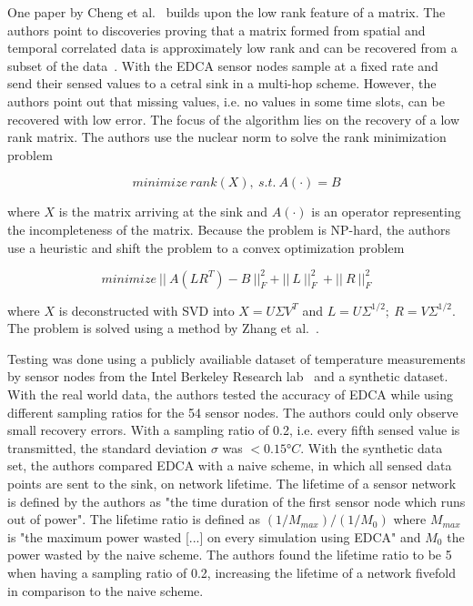 One paper by Cheng et al.~\cite{cheng2010efficient} builds upon the low rank
feature of a matrix. The authors point to discoveries proving that a matrix
formed from spatial and temporal correlated data is approximately low rank and
can be recovered from a subset of the data~\cite{vuran2004spatio,
candes2009exact}. With the \ac{EDCA} sensor nodes sample at a fixed rate and
send their sensed values to a cetral sink in a multi-hop scheme. However, the
authors point out that missing values, i.e. no values in some time slots, can
be recovered with low error. The focus of the algorithm lies on the recovery of
a low rank
matrix. The authors use the nuclear norm to solve the rank minimization problem

$$
minimize \ rank(X), \ s.t. \ A(\cdot)=B
$$

where $ X $ is the matrix arriving at the sink and $ A(\cdot) $ is an operator
representing the incompleteness of the matrix. Because the problem is NP-hard,
the authors use a heuristic and shift the problem to a convex optimization
problem

$$
minimize \ || \ A(LR^T) - B \ ||^2_F + || \ L \ ||^2_F \ + || \ R \ ||^2_F
$$

where $ X $ is deconstructed with \ac{SVD} into $ X = U \Sigma V^T $ and $ L =
U\Sigma^{1/2}; \ R = V\Sigma^{1/2}$. The problem is solved using a method by
Zhang et al.~\cite{zhang2009spatio}.

Testing was done using a publicly availiable dataset of temperature
measurements by sensor nodes from the Intel Berkeley Research
lab~\cite{labdata} and a synthetic dataset. With the real world data, the
authors tested the accuracy of \ac{EDCA} while using different sampling ratios
for the 54 sensor nodes. The authors could only observe small recovery errors.
With a sampling ratio of 0.2, i.e. every fifth sensed value is transmitted, the
standard deviation $ \sigma $ was $ < 0.15°C $. With the synthetic data set,
the authors compared \ac{EDCA} with a naive scheme, in which all sensed data
points are sent to the sink, on network lifetime. The lifetime of a sensor
network is defined by the authors as "the time duration of the first sensor
node which runs out of power". The lifetime ratio is defined as $ (1/M_{max}) /
(1/M_0) $ where $ M_{max} $ is "the maximum power wasted [...] on every
simulation using \ac{EDCA}" and $ M_0 $ the power wasted by the naive scheme.
The authors found the lifetime ratio to be 5 when having a sampling ratio of
0.2, increasing the lifetime of a network fivefold in comparison to the naive
scheme.

